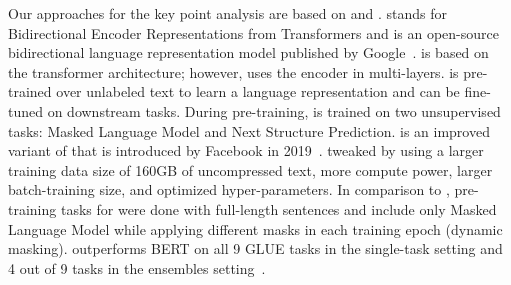 Our approaches for the key point analysis are based on \Bert and \Roberta. \Bert stands for Bidirectional Encoder Representations from Transformers and is an open-source bidirectional language representation model published by Google~\cite{DevlinCLT2019}. \Bert is based on the transformer architecture; however, uses the encoder in multi-layers. 
\Bert is pre-trained over unlabeled text to learn a language representation and can be fine-tuned on downstream tasks. During pre-training, \Bert is trained on two unsupervised tasks: Masked Language Model and Next Structure Prediction. \Roberta is an improved variant of \Bert that is introduced by Facebook in 2019~\cite{LiuOGDJCLLZS2019}. \citet{LiuOGDJCLLZS2019} tweaked \Bert by using a larger training data size of 160GB of uncompressed text, more compute power, larger batch-training size, and optimized hyper-parameters. In comparison to \Bert, pre-training tasks for \Roberta were done with full-length sentences and include only Masked Language Model while applying different masks in each training epoch (dynamic masking). \Roberta outperforms BERT on all 9 GLUE tasks in the single-task setting and 4 out of 9 tasks in the ensembles setting~\cite{WangSMHLB2018,LiuOGDJCLLZS2019}.






